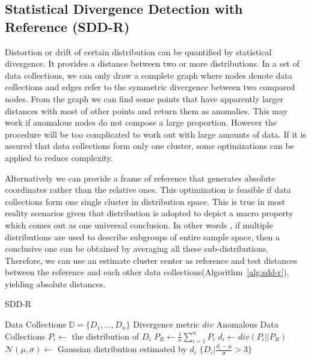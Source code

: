 \documentclass{article}
\begin{document}
		\subsection{Statistical Divergence Detection with Reference (SDD-R)}\label{sec:alg-opt-reference}
			Distortion or drift of certain distribution can be quantified by statistical divergence.
			It provides a distance between two or more distributions. In a set of data collections, we can only draw a complete graph where nodes denote data collections and edges refer to the symmetric divergence between two compared nodes. From the graph we can find some points that have apparently larger distances with most of other points and return them as anomalies. This may work if anomalous nodes do not compose a large proportion. However the procedure will be too complicated to work out with large amounts of data. If it is assured that data collections form only one cluster, some optimizations can be applied to reduce complexity.
			
			Alternatively we can provide a frame of reference that generates absolute coordinates rather than the relative ones. This optimization is feasible if data collections form one single cluster in distribution space. This is true in most reality scenarios given that distribution is adopted to depict a macro property which comes out as one universal conclusion. In other words , if multiple distributions are used to describe subgroups of entire sample space, then a conclusive one can be obtained by averaging all these sub-distributions. Therefore, we can use an estimate cluster center as reference and test distances between the reference and each other data collections(Algorithm~\ref{alg:sdd-r}), yielding absolute distances.
	
			\begin{algorithm}[!t]
				\caption{SDD-R}
				\label{alg:sdd-r}
				\begin{algorithmic}[1]
					\Require Data Collections $\mathbb{D} = \{D_1, \dots, D_n\}$
					\Require Divergence metric $div$
					\Ensure Anomalous Data Collections
					\State $P_i \gets$ the distribution of $D_i$
					\EndFor
					\State $P_R \gets \frac{1}{n}\sum_{i = 1}^n P_i$
					\State $d_i \gets div(P_i||P_R)$
					\EndFor
					\State $\mathcal{N}(\mu, \sigma) \gets$ Gaussian distribution estimated by $d_i$
					\State \Return $\{D_i | \frac{d_i - \mu}{\sigma} > 3 \}$
				\end{algorithmic}
			\end{algorithm}
	
\end{document}
